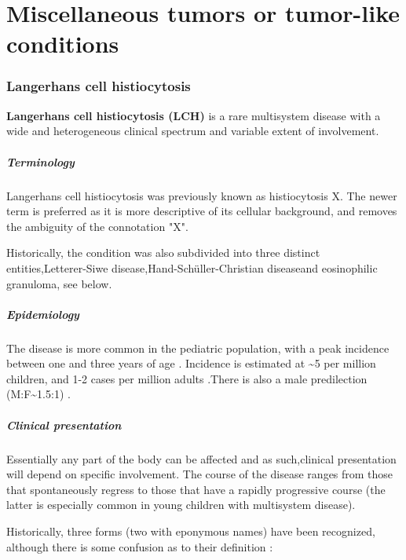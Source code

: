 \chapter{Miscellaneous tumors or tumor-like conditions}

\subsection{Langerhans cell histiocytosis}

\textbf{Langerhans cell histiocytosis (LCH)} is a rare multisystem disease with a wide and heterogeneous clinical spectrum and variable extent of involvement.

\paragraph{Terminology}

Langerhans cell histiocytosis was previously known as histiocytosis X. The newer term is preferred as it is more descriptive of its cellular background, and removes the ambiguity of the connotation "X".

Historically, the condition was also subdivided into three distinct entities,Letterer-Siwe disease,Hand-Schüller-Christian diseaseand eosinophilic granuloma, see below.

\paragraph{Epidemiology}

The disease is more common in the pediatric population, with a peak incidence between one and three years of age . Incidence is estimated at \textasciitilde5 per million children, and 1-2 cases per million adults .There is also a male predilection (M:F\textasciitilde1.5:1) .

\paragraph{Clinical presentation}

Essentially any part of the body can be affected and as such,clinical presentation will depend on specific involvement. The course of the disease ranges from those that spontaneously regress to those that have a rapidly progressive course (the latter is especially common in young children with multisystem disease).

Historically, three forms (two with eponymous names) have been recognized, although there is some confusion as to their definition :


